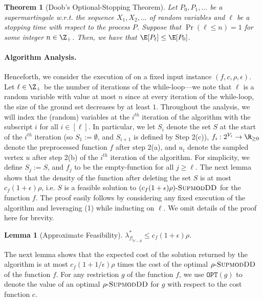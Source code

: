 \documentclass{article}
\newtheorem{lemma}{Lemma}[section]
\newtheorem{theorem}{Theorem}[section]
\newcommand{\OPT}{\ensuremath{\mathtt{OPT}}\xspace}
\newcommand{\sdds}{\ensuremath{\textsc{SupmodDD}}\xspace}
\newcommand{\rhosdds}[1]{\ensuremath{#1\text{-}\sdds}}
\begin{document}
\begin{theorem}[Doob’s Optional-Stopping Theorem]\label{thm:doob}
    Let $P_0, P_1, \ldots $ be a supermartingale  w.r.t. the sequence $X_1, X_2, \ldots $ of random variables and $\ell$ be a stopping time with respect to the process $P$. Suppose that $\Pr(\ell \leq n) = 1$ for some integer $n\in \Z_+$. Then, we have that  $\E[P_\ell] \leq \E[P_0]$.
\end{theorem} 

\paragraph{Algorithm Analysis. } Henceforth, we consider the execution of  on a fixed input instance $(f, c, \rho, \epsilon)$.  Let $\ell \in \Z_+$ be the number of iterations of the while-loop---we note that $\ell$ is a random variable with value at most $n$ since at every iteration of the while-loop, the size of the ground set decreases by at least $1$. Throughout the analysis, we will index the (random) variables at the $i^{th}$ iteration of the algorithm with the subscript $i$ for all $i \in [\ell]$. In particular, we let $S_i$ denote the set $S$ at the start of the $i^{th}$ iteration (so $S_1 := \emptyset$, and $S_{i+1}$ is defined by Step 2(c)), $f_i:2^{V_i}\rightarrow\R_{\geq0}$ denote the preprocessed function $f$ after step 2(a), and $u_i$ denote the sampled vertex $u$ after step 2(b) of the $i^{th}$ iteration of the algorithm.
For simplicity, we define $S_{j} := S$, and $f_{j}$ to be the empty-function for all $j \geq \ell$. The next lemma shows that the density of the function after deleting the set $S$ is at most $c_f(1+\epsilon)\rho$, i.e. $S$ is a feasible solution to \rhosdds{(c_f(1+\epsilon)\rho)} for the function $f$. The proof easily follows by considering any fixed execution of the algorithm and leveraging (1) while inducting on $\ell$. We omit details of the proof here for brevity.

\begin{lemma}[Approximate Feasibility]\label{lem:bicriteria-random-deletion:approximate-feasibility}
$\lambda^*_{f|_{V - S}} \leq c_f(1+\epsilon)\rho$.
\end{lemma}

The next lemma shows that the expected cost of the solution returned by the algorithm is at most $c_f(1+1/\epsilon)\rho$ times the cost of the optimal \rhosdds{\rho} of the function $f$. For any restriction $g$ of the function $f$, we use $\OPT(g)$ to denote the value of an optimal $\rhosdds{\rho}$ for $g$ with respect to the cost function $c$.
\end{document}
